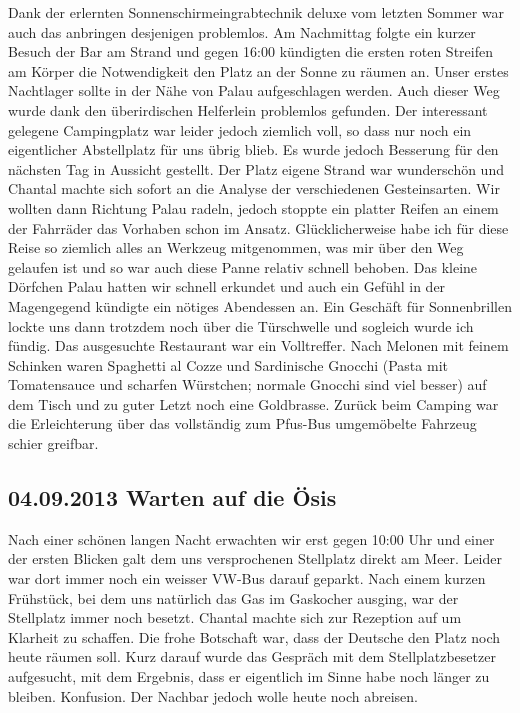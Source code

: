 Dank der erlernten Sonnenschirmeingrabtechnik deluxe vom letzten Sommer war auch das anbringen desjenigen problemlos.
Am Nachmittag folgte ein kurzer Besuch der Bar am Strand und gegen 16:00 kündigten die ersten roten Streifen am Körper die Notwendigkeit den Platz an der Sonne zu räumen an.
Unser erstes Nachtlager sollte in der Nähe von Palau aufgeschlagen werden.
Auch dieser Weg wurde dank den überirdischen Helferlein problemlos gefunden.
Der interessant gelegene Campingplatz war leider jedoch ziemlich voll, so dass nur noch ein eigentlicher Abstellplatz für uns übrig blieb.
Es wurde jedoch Besserung für den nächsten Tag in Aussicht gestellt.
Der Platz eigene Strand war wunderschön und Chantal machte sich sofort an die Analyse der verschiedenen Gesteinsarten.
Wir wollten dann Richtung Palau radeln, jedoch stoppte ein platter Reifen an einem der Fahrräder das Vorhaben schon im Ansatz.
Glücklicherweise habe ich für diese Reise so ziemlich alles an Werkzeug mitgenommen, was mir über den Weg gelaufen ist und so war auch diese Panne relativ schnell behoben.
Das kleine Dörfchen Palau hatten wir schnell erkundet und auch ein Gefühl in der Magengegend kündigte ein nötiges Abendessen an.
Ein Geschäft für Sonnenbrillen lockte uns dann trotzdem noch über die Türschwelle und sogleich wurde ich fündig.
Das ausgesuchte Restaurant war ein Volltreffer.
Nach Melonen mit feinem Schinken waren Spaghetti al Cozze und Sardinische Gnocchi (Pasta mit Tomatensauce und scharfen Würstchen; normale Gnocchi sind viel besser) auf dem Tisch und zu guter Letzt noch eine Goldbrasse.
Zurück beim Camping war die Erleichterung über das vollständig zum Pfus-Bus umgemöbelte Fahrzeug schier greifbar.

\subsection{04.09.2013 Warten auf die Ösis} 
Nach einer schönen langen Nacht erwachten wir erst gegen 10:00 Uhr und einer der ersten Blicken galt dem uns versprochenen Stellplatz direkt am Meer.
Leider war dort immer noch ein weisser VW-Bus darauf geparkt.
Nach einem kurzen Frühstück, bei dem uns natürlich das Gas im Gaskocher ausging, war der Stellplatz immer noch besetzt.
Chantal machte sich zur Rezeption auf um Klarheit zu schaffen.
Die frohe Botschaft war, dass der Deutsche den Platz noch heute räumen soll.
Kurz darauf wurde das Gespräch mit dem Stellplatzbesetzer aufgesucht, mit dem Ergebnis, dass er eigentlich im Sinne habe noch länger zu bleiben.
Konfusion.
Der Nachbar jedoch wolle heute noch abreisen.

